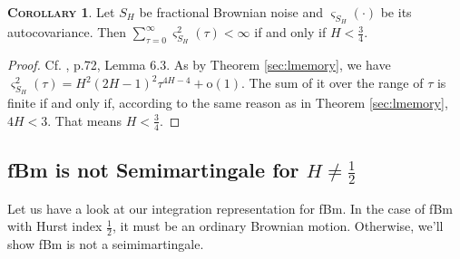 \documentclass[a4paper, twoside, 11pt]{article}
\theoremstyle{definition}
\newtheorem{corollary}[definition]{\scshape Corollary}
\begin{document}
\begin{corollary}
  Let $S_H$ be fractional Brownian noise and $\varsigma_{S_H}(\cdot)$ be its autocovariance. Then $\sum_{\tau=0}^{\infty}\varsigma^2_{S_H}(\tau)<\infty$ if and only if $H < \frac{3}{4}$.
\end{corollary}
\begin{proof}
  Cf. \cite{nourdin}, p.72, Lemma 6.3. As by Theorem \ref{sec:lmemory}, we have $\varsigma_{S_H}^2(\tau) = H^2(2H-1)^2\tau^{4H-4} + \mathrm{o}(1) $. The sum of it over the range of $\tau$ is finite if and only if, according to the same reason as in Theorem \ref{sec:lmemory}, $4H<3$. That means $H < \frac{3}{4}$.
\end{proof}
\subsection{fBm is not Semimartingale for $H\neq \frac{1}{2}$}
Let us have a look at our integration representation for fBm. In the case of fBm with Hurst index $\frac{1}{2}$, it must be an ordinary Brownian motion. Otherwise, we'll show fBm is not a seimimartingale.
\end{document}

